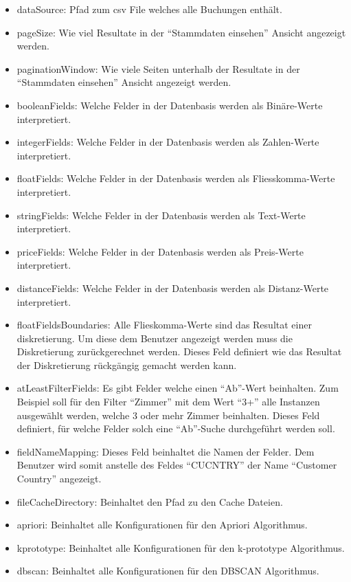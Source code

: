 \begin{itemize}
\item dataSource: Pfad zum \gls{csv} File welches alle Buchungen enthält.
\item pageSize: Wie viel Resultate in der "`Stammdaten einsehen"' Ansicht angezeigt werden.
\item paginationWindow: Wie viele Seiten unterhalb der Resultate in der "`Stammdaten einsehen"' Ansicht angezeigt werden.
\item booleanFields: Welche Felder in der Datenbasis werden als Binäre-Werte interpretiert.
\item integerFields: Welche Felder in der Datenbasis werden als Zahlen-Werte interpretiert.
\item floatFields: Welche Felder in der Datenbasis werden als Fliesskomma-Werte interpretiert.
\item stringFields: Welche Felder in der Datenbasis werden als Text-Werte interpretiert.
\item priceFields: Welche Felder in der Datenbasis werden als Preis-Werte interpretiert.
\item distanceFields: Welche Felder in der Datenbasis werden als Distanz-Werte interpretiert.
\item floatFieldsBoundaries: Alle Flieskomma-Werte sind das Resultat einer diskretierung. Um diese dem Benutzer angezeigt werden muss die Diskretierung zurückgerechnet werden. Dieses Feld definiert wie das Resultat der Diskretierung rückgängig gemacht werden kann.
\item atLeastFilterFields: Es gibt Felder welche einen "`Ab"'-Wert beinhalten. Zum Beispiel soll für den Filter "`Zimmer"' mit dem Wert "`3+"' alle Instanzen ausgewählt werden, welche 3 oder mehr Zimmer beinhalten. Dieses Feld definiert, für welche Felder solch eine "`Ab"'-Suche durchgeführt werden soll.
\item fieldNameMapping: Dieses Feld beinhaltet die Namen der Felder. Dem Benutzer wird somit anstelle des Feldes "`CUCNTRY"' der Name "`Customer Country"' angezeigt.
\item fileCacheDirectory: Beinhaltet den Pfad zu den Cache Dateien.
\item apriori: Beinhaltet alle Konfigurationen für den Apriori Algorithmus.
\item kprototype: Beinhaltet alle Konfigurationen für den k-prototype Algorithmus.
\item dbscan: Beinhaltet alle Konfigurationen für den DBSCAN Algorithmus.
\end{itemize}

